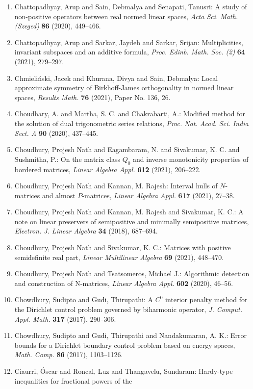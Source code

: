 \begin{enumerate}
\item Chattopadhyay, Arup and Sain, Debmalya and Senapati, Tanusri: A study of non-positive operators between real normed linear
spaces, \emph{Acta Sci. Math. (Szeged)} {\bf 86} (2020), 449--466.
\item Chattopadhyay, Arup and Sarkar, Jaydeb and Sarkar, Srijan: Multiplicities, invariant subspaces and an additive formula, \emph{Proc. Edinb. Math. Soc. (2)} {\bf 64} (2021), 279--297.
\item Chmieli\'{n}ski, Jacek and Khurana, Divya and Sain, Debmalya: Local approximate symmetry of {B}irkhoff-{J}ames orthogonality
in normed linear spaces, \emph{Results Math.} {\bf 76} (2021), Paper No. 136, 26.
\item Choudhary, A. and Martha, S. C. and Chakrabarti, A.: Modified method for the solution of dual trigonometric series
relations, \emph{Proc. Nat. Acad. Sci. India Sect. A} {\bf 90} (2020), 437--445.
\item Choudhury, Projesh Nath and Eagambaram, N. and Sivakumar, K.
C. and Sushmitha, P.: On the matrix class {$Q_0$} and inverse monotonicity
properties of bordered matrices, \emph{Linear Algebra Appl.} {\bf 612} (2021), 206--222.
\item Choudhury, Projesh Nath and Kannan, M. Rajesh: Interval hulls of {$N$}-matrices and almost {$P$}-matrices, \emph{Linear Algebra Appl.} {\bf 617} (2021), 27--38.
\item Choudhury, Projesh Nath and Kannan, M. Rajesh and Sivakumar,
K. C.: A note on linear preservers of semipositive and minimally
semipositive matrices, \emph{Electron. J. Linear Algebra} {\bf 34} (2018), 687--694.
\item Choudhury, Projesh Nath and Sivakumar, K. C.: Matrices with positive semidefinite real part, \emph{Linear Multilinear Algebra} {\bf 69} (2021), 448--470.
\item Choudhury, Projesh Nath and Tsatsomeros, Michael J.: Algorithmic detection and construction of {N}-matrices, \emph{Linear Algebra Appl.} {\bf 602} (2020), 46--56.
\item Chowdhury, Sudipto and Gudi, Thirupathi: A {$C^0$} interior penalty method for the {D}irichlet control
problem governed by biharmonic operator, \emph{J. Comput. Appl. Math.} {\bf 317} (2017), 290--306.
\item Chowdhury, Sudipto and Gudi, Thirupathi and Nandakumaran, A.
K.: Error bounds for a {D}irichlet boundary control problem based
on energy spaces, \emph{Math. Comp.} {\bf 86} (2017), 1103--1126.
\item Ciaurri, \'{O}scar and Roncal, Luz and Thangavelu, Sundaram: Hardy-type inequalities for fractional powers of the

\end{enumerate}
